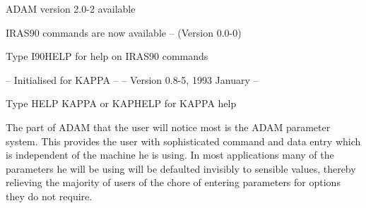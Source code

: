 \documentclass[twoside,11pt]{starlink}
\begin{document}
\begin{itemize}
\begin{small}
\begin{terminalv}
  ADAM version 2.0-2 available


   IRAS90 commands are now available -- (Version 0.0-0)

   Type I90HELP for help on IRAS90 commands


 --      Initialised for KAPPA      --
 --   Version 0.8-5, 1993 January   --

 Type HELP KAPPA or KAPHELP for KAPPA help
\end{terminalv}
\end{small}
\end{itemize}

The part of ADAM that the user will notice most is the ADAM parameter system.
This provides the user with sophisticated command and data entry which is
independent of the machine he is using. In most applications many of the
parameters he will be using will be defaulted invisibly to sensible values,
thereby relieving the majority of users of the chore of entering parameters for
options they do not require.
\end{document}
